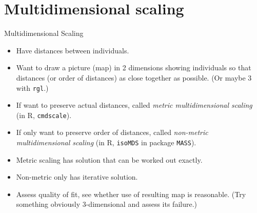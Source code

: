\section{Multidimensional scaling}
\frame{\sectionpage}


\begin{frame}[fragile]{Multidimensional Scaling}

  \begin{itemize}
  \item Have distances between individuals.
  \item Want to draw a picture (map) in 2 dimensions showing
    individuals so that distances (or order of distances) as close
    together as possible. (Or maybe 3 with \texttt{rgl}.)
  \item If want to preserve actual distances, called {\em metric
      multidimensional scaling} (in R, \texttt{cmdscale}).
  \item If only want to preserve order of distances, called {\em
      non-metric multidimensional scaling} (in R, \texttt{isoMDS} in
    package \texttt{MASS}).
  \item Metric scaling has solution that can be worked out exactly.
  \item Non-metric only has iterative solution.
  \item Assess quality of fit, see whether use of resulting map is
    reasonable. (Try something obviously 3-dimensional and assess its
    failure.)
  \end{itemize}

\end{frame}

